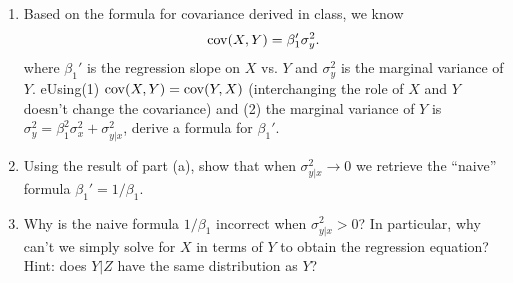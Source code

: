 \begin{exercise}
\begin{enumerate}[label=(\alph*)]
\item Based on the formula for covariance derived in class, we know 
\begin{equation*}
{\rm cov}(X,Y)  =\beta_1'\sigma_y^2.
\end{equation*}
where $\beta_1'$ is the regression slope on $X$ vs. $Y$ and $\sigma_y^2$ is the marginal variance of $Y$.  
eUsing(1)  ${\rm cov}(X,Y) = {\rm cov}(Y,X)$ (interchanging the role of $X$ and $Y$ doesn't change the covariance) and (2) the marginal variance of $Y$ is $\sigma_y^2 = \beta_1^2\sigma_x^2 + \sigma_{y|x}^2$, derive a formula for $\beta_1'$. 
\item Using the result of part (a), show that when $\sigma_{y|x}^2 \to 0$ we retrieve the ``naive'' formula $\beta_1' = 1/\beta_1$. 
\item Why is the naive formula $1/\beta_1$ incorrect when $\sigma_{y|x}^2>0$? In particular, why can't we simply solve for $X$ in terms of $Y$ to obtain the regression equation? Hint: does $Y|Z$ have the same distribution as $Y$? 
\end{enumerate}
\end{exercise}





